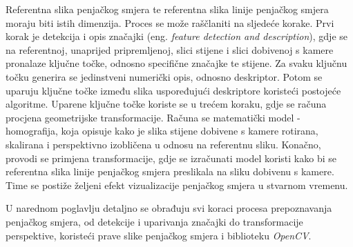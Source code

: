 Referentna slika penjačkog smjera te referentna slika linije penjačkog smjera moraju biti istih dimenzija. Proces se može raščlaniti na sljedeće korake.
Prvi korak je detekcija i opis značajki (eng. \textit{feature detection and description}), gdje se na referentnoj, unaprijed pripremljenoj, slici stijene i slici dobivenoj s kamere pronalaze ključne točke, odnosno specifične značajke te stijene. Za svaku ključnu točku generira se jedinstveni numerički opis, odnosno deskriptor. Potom se uparuju ključne točke između slika uspoređujući deskriptore koristeći postojeće algoritme. 
Uparene ključne točke koriste se u trećem koraku, gdje se računa procjena geometrijske transformacije. Računa se matematički model - homografija, koja opisuje kako je slika stijene dobivene s kamere rotirana, skalirana i perspektivno izobličena u odnosu na referentnu sliku. Konačno, provodi se primjena transformacije, gdje se izračunati model koristi kako bi se referentna slika linije penjačkog smjera preslikala na sliku dobivenu s kamere. Time se postiže željeni efekt vizualizacije penjačkog smjera u stvarnom vremenu.

U narednom poglavlju detaljno se obrađuju svi koraci procesa prepoznavanja penjačkog smjera, od detekcije i uparivanja značajki do transformacije perspektive, koristeći prave slike penjačkog smjera i biblioteku \textit{OpenCV}.



